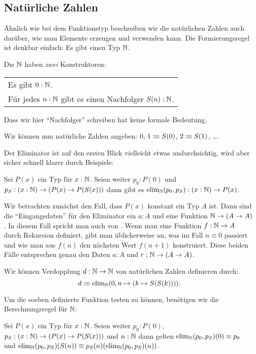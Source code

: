 \subsection{Natürliche Zahlen}
Ähnlich wie bei dem Funktionstyp beschreiben wir die natürlichen Zahlen auch darüber, wie man Elemente erzeugen und verwenden kann.
Die Formierungsregel ist denkbar einfach: Es gibt einen Typ $\N$\index{$\N$}.

Die  $\N$ haben \emph{zwei} Konstruktoren:
\begin{center}
\begin{tabular}{l}
  Es gibt $0:\mathbb{N}$. \\
  Für jedes $n:\mathbb{N}$ gibt es einen Nachfolger $S(n):\mathbb{N}$\index{$S(n)$}.
\end{tabular}
\end{center}
Dass wir hier ``Nachfolger'' schreiben hat keine formale Bedeutung.
\begin{beispiel}
Wir können nun natürliche Zahlen angeben: $0$, $1\vcentcolon\mspace{-1.2mu}\equiv S(0)$, $2\vcentcolon\mspace{-1.2mu}\equiv S(1)$, \dots.
\end{beispiel}
Der Eliminator ist auf den ersten Blick vielleicht etwas undurchsichtig, wird aber sicher schnell klarer durch Beispiele:
\begin{center}
  Sei $P(x)$ ein Typ für $x:\mathbb{N}$.
  Seien weiter $p_0:P(0)$ und $p_S:(x:\mathbb{N})\to (P(x)\to P(S(x)))$ dann gibt es
  $\mathrm{elim}_{\mathbb{N}}(p_0,p_S):(x:\mathbb{N})\to P(x)$.
\end{center}
Wir betrachten zunächst den Fall, dass $P(x)$ konstant ein Typ $A$ ist.
Dann sind die ``Eingangsdaten'' für den Eliminator ein $a:A$ und eine Funktion $\mathbb{N}\to (A\to A)$.
In diesem Fall spricht man auch von .
Wenn man eine Funktion $f:\mathbb{N}\to A$ durch Rekursion definiert, gibt man üblicherweise an, was im Fall $n\equiv 0$ passiert und wie man aus $f(n)$ den nächsten Wert $f(n+1)$ konstruiert.
Diese beiden Fälle entsprechen genau den Daten $a:A$ und $r:\mathbb{N}\to (A\to A)$.
\begin{beispiel}
  Wir können Verdopplung $d:\mathbb{N}\to \mathbb{N}$ von natürlichen Zahlen definieren durch:
  \[d\colonequiv \elim_\N(0,n\mapsto (k\mapsto S(S(k))))\rlap{.}\]
\end{beispiel}
Um die soeben definierte Funktion testen zu können, benötigen wir die Berechnungsregel für $\N$:
\begin{center}
  Sei $P(x)$ ein Typ für $x:\mathbb{N}$.
  Seien weiter $p_0:P(0)$, $p_S:(x:\mathbb{N})\to (P(x)\to P(S(x)))$ und $n:\mathbb{N}$
  dann gelten $\mathrm{elim}_{\mathbb{N}}(p_0,p_S)(0)\equiv p_0$ und $\mathrm{elim}_{\mathbb{N}}(p_0,p_S)(S(n))\equiv p_S(n)(\mathrm{elim}_{\mathbb{N}}(p_0,p_S)(n))$.
\end{center}
